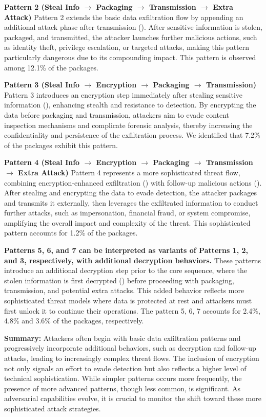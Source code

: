 \textbf{Pattern 2 (Steal Info $\rightarrow$ Packaging $\rightarrow$ Transmission $\rightarrow$ Extra Attack)} Pattern 2 extends the basic data exfiltration flow by appending an additional attack phase after transmission (). After sensitive information is stolen, packaged, and transmitted, the attacker launches further malicious actions, such as identity theft, privilege escalation, or targeted attacks, making this pattern particularly dangerous due to its compounding impact. This pattern is observed among 12.1\% of the packages. 

\textbf{Pattern 3 (Steal Info $\rightarrow$ Encryption $\rightarrow$ Packaging $\rightarrow$ Transmission)} Pattern 3 introduces an encryption step immediately after stealing sensitive information (), enhancing stealth and resistance to detection. By encrypting the data before packaging and transmission, attackers aim to evade content inspection mechanisms and complicate forensic analysis, thereby increasing the confidentiality and persistence of the exfiltration process. We identified that 7.2\% of the packages exhibit this pattern.

\textbf{Pattern 4 (Steal Info $\rightarrow$ Encryption $\rightarrow$ Packaging $\rightarrow$ Transmission $\rightarrow$ Extra Attack)} Pattern 4 represents a more sophisticated threat flow, combining encryption-enhanced exfiltration () with follow-up malicious actions (). After stealing and encrypting the data to evade detection, the attacker packages and transmits it externally, then leverages the exfiltrated information to conduct further attacks, such as impersonation, financial fraud, or system compromise, amplifying the overall impact and complexity of the threat. This sophisticated pattern accounts for 1.2\% of the packages. 


\textbf{Patterns 5, 6, and 7 can be interpreted as variants of Patterns 1, 2, and 3, respectively, with additional decryption behaviors.} These patterns introduce an additional decryption step prior to the core sequence, where the stolen information is first decrypted () before proceeding with packaging, transmission, and potential extra attacks. This added behavior reflects more sophisticated threat models where data is protected at rest and attackers must first unlock it to continue their operations. The pattern 5, 6, 7 accounts for 2.4\%, 4.8\% and 3.6\% of the packages, respectively.

\begin{tcolorbox}[size=title, opacityfill=0.15, after=\vspace{-10pt}]
\textbf{Summary:} Attackers often begin with basic data exfiltration patterns and progressively incorporate additional behaviors, such as decryption and follow-up attacks, leading to increasingly complex threat flows. The inclusion of encryption not only signals an effort to evade detection but also reflects a higher level of technical sophistication. While simpler patterns occurs more frequently, the presence of more advanced patterns, though less common, is significant. As adversarial capabilities evolve, it is crucial to monitor the shift toward these more sophisticated attack strategies.
\end{tcolorbox}

